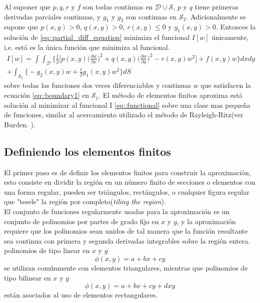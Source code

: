 \documentclass[a4paper]{article}
\begin{document}
Al suponer que $p,q,r$ y $f$ son todas continuas en $\mathcal{D}\cup\mathcal{S}$, $p$ y $q$ tiene primeras derivadas parciales continuas, y $g_1$ y $g_2$ son continuas en $\mathcal{S}_2$. Adicionalmente se supone que $p(x,y)>0, \, q(x,y)>0,\,r(x,y)\leq 0$ y $g_1(x,y)>0$. Entonces la solución de \ref{eq::partial_diff_equation} minimiza el funcional $I[w]$ únicamente, i.e. está es la única función que minimiza al funcional.
\begin{equation}\label{eq::functional}
\begin{aligned}
I[w]=\int\int_{\mathcal{D}}\Bigg\{ \frac{1}{2}\Big[p(x,y)\Big( \frac{\partial w}{\partial x} \Big)^2 + q(x,y)\Big( \frac{\partial w}{\partial y} \Big)^2 -r(x,y) w^2 \Big] +f(x,y)w\Bigg\}dx dy\\
+\int_{\mathcal{S}_2}\Bigg\{ -g_2(x,y)w+\frac{1}{2}g_1(x,y)w^2 \Bigg\}dS
\end{aligned}
\end{equation}
sobre todas las funciones dos veces diferenciables y continuas $w$ que satisfacen la ecuación \ref{eq::boundary1} en $\mathcal{S}_1$. El método de elementos finitos aproxima está solución al minimizar al funcional I \ref{eq::functional} sobre una clase mas pequeña de funciones, similar al acercamiento utilizado el método de Rayleigh-Ritz(ver Burden. \cite{Burden}).
\subsection{Definiendo los elementos finitos}
El primer paso es de definir los elementos finitos para construir la aproximación, esto consiste en dividir la región en un número finito de secciones o elementos con una forma regular, pueden ser triángulos, rectángulos, o cualquier figura regular que "tesele"  la región por completo(\textit{tiling the region}).\\

El conjunto de funciones regularmente usadas para la aproximación es un conjunto de polinomios por partes de grado fijo en $x$ y $y$, y la aproximación requiere que los polinomios sean unidos de tal manera que la función resultante sea continua con primera y segunda derivadas integrables sobre la región entera. polinomios de tipo linear en $x$ y $y$ 
\begin{equation}
\phi(x,y)=a+bx+cy
\end{equation}
se utilizan comúnmente con elementos triangulares, mientras que polinomios de tipo bilinear en $x$ y $y$
\begin{equation}
\phi(x,y)=a+bx+cy+dxy
\end{equation}
están asociados al uso de elementos rectangulares.\\
\end{document}
